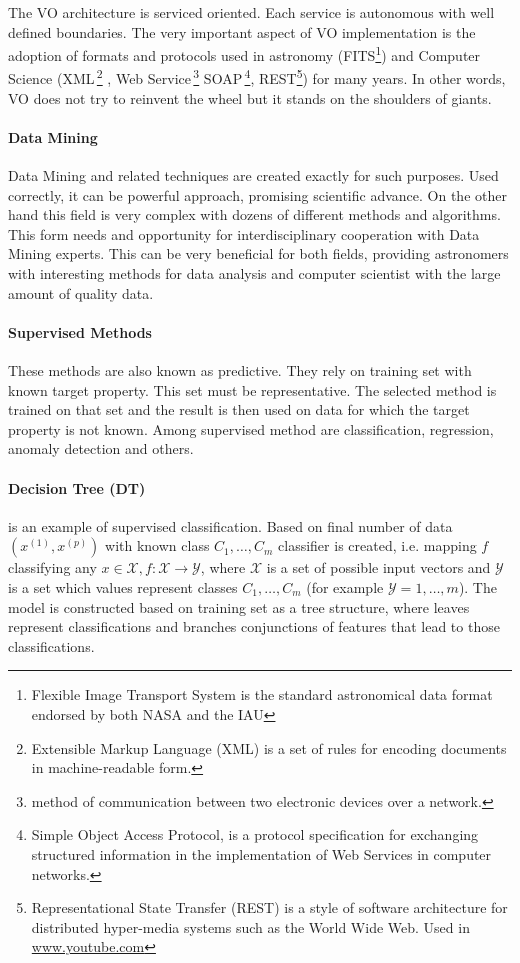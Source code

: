 
    The VO architecture is serviced oriented. Each service is
    autonomous with well defined boundaries. The very important aspect
    of VO implementation is the adoption of formats and protocols used
    in astronomy (FITS\footnote{Flexible Image Transport System is
      the standard astronomical data format endorsed by both NASA and
      the IAU }) and Computer Science
    (XML\,\footnote{Extensible Markup Language (XML) is a set of rules
      for encoding documents in machine-readable form.} , Web
    Service\,\footnote{method of communication between two electronic
      devices over a network.}  SOAP\,\footnote{Simple Object Access
      Protocol, is a protocol specification for exchanging structured
      information in the implementation of Web Services in computer
      networks.}, REST\footnote{Representational State Transfer (REST)
      is a style of software architecture for distributed hyper-media
      systems such as the World Wide Web. Used in
      \url{www.youtube.com} }) for many years. In other words, VO does
    not try to reinvent the wheel but it stands on the shoulders of
    giants.


\paragraph{Data Mining}
Data Mining and related techniques are created exactly for such
purposes. Used correctly, it can be powerful approach, promising
scientific advance. On the other hand this field is very complex with
dozens of different methods and algorithms. This form needs and
opportunity for interdisciplinary cooperation with Data Mining
experts. This can be very beneficial for both fields, providing
astronomers with interesting methods for data analysis and computer
scientist with the large amount of quality data.
\paragraph{Supervised Methods}
These methods are also known as predictive\cite{ball2010data}. They
rely on training set with known target property. This set must be
representative. The selected method is trained on that set and the
result is then used on data for which the target property is not
known. Among supervised method are classification, regression, anomaly
detection and others.

\paragraph{Decision Tree (DT)} is an example of supervised
classification. Based on final number of data
$(x^{(1)}, x^{(p)})$ with known class $C_1,\ldots, C_m$
classifier is created, i.e. mapping $f$ classifying any $x \in
\mathcal{X}, f:\mathcal{X}\rightarrow \mathcal{Y}$, where
$\mathcal{X}$ is a set of possible input vectors and $\mathcal{Y}$ is
a set which values represent classes $C_1,\ldots, C_m$ (for example
$\mathcal{Y} = {1,\ldots,m}$). The model is constructed based on
training set as a tree structure, where leaves represent
classifications and branches conjunctions of features that lead to
those classifications.

